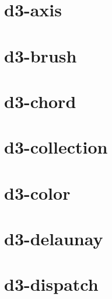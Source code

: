 \documentclass[twoside]{book}
\newcommand{\+}{\discretionary{\mbox{\scriptsize$\hookleftarrow$}}{}{}}
\begin{document}
\chapter{d3-\/axis}
\label{md_dsmacc_examples_DRmerge_node_modules_d3-axis_README}

\chapter{d3-\/brush}
\label{md_dsmacc_examples_DRmerge_node_modules_d3-brush_README}

\chapter{d3-\/chord}
\label{md_dsmacc_examples_DRmerge_node_modules_d3-chord_README}

\chapter{d3-\/collection}
\label{md_dsmacc_examples_DRmerge_node_modules_d3-collection_README}

\chapter{d3-\/color}
\label{md_dsmacc_examples_DRmerge_node_modules_d3-color_README}

\chapter{d3-\/delaunay}
\label{md_dsmacc_examples_DRmerge_node_modules_d3-delaunay_README}

\chapter{d3-\/dispatch}
\label{md_dsmacc_examples_DRmerge_node_modules_d3-dispatch_README}

\end{document}

